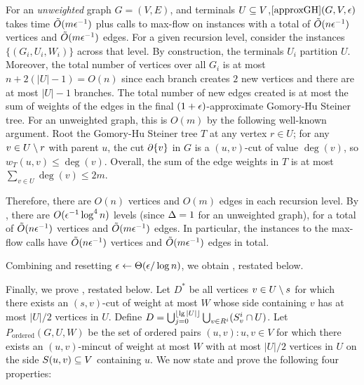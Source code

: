 \BL{}
For an \emph{unweighted} graph $G=(V,E)$, and terminals $U\subseteq V$,\linebreak $\ref{approxGH}(G,V,\epsilon)$ takes time $\tilde{O}(m\epsilon^{-1})$ plus calls to max-flow on instances with a total of $\tilde{O}(n\epsilon^{-1})$ vertices and $\tilde{O}(m\epsilon^{-1})$ edges.%
\EL
\BP
For a given recursion level, consider the instances $\{ (G_i,U_i,W_i)\}$ across that level. By construction, the terminals $U_i$ partition $U$. Moreover, the total number of vertices over all $G_i$ is at most $n+2(|U|-1)=O(n)$ since each branch creates $2$ new vertices and there are at most $|U|-1$ branches. The total number of new edges created is at most the sum of weights of the edges in the final $(1+\epsilon)$-approximate Gomory-Hu Steiner tree. For an unweighted graph, this is $O(m)$ by the following well-known argument. Root the Gomory-Hu Steiner tree $T$ at any vertex $r\in U$; for any $v\in U\setminus r$ with parent $u$, the cut $\partial\{v\}$ in $G$ is a $(u,v)$-cut of value $\deg(v)$, so $w_T(u,v)\le\deg(v)$. Overall, the sum of the edge weights in $T$ is at most $\sum_{v\in U}\deg(v)\le2m$.

Therefore, there are $O(n)$ vertices and $O(m)$ edges in each recursion level. By , there are $O(\epsilon^{-1}\log^4n)$ levels (since $\Delta=1$ for an unweighted graph), for a total of $\tilde{O}(n\epsilon^{-1})$ vertices and $\tilde{O}(m\epsilon^{-1})$ edges. In particular, the instances to the max-flow calls have $\tilde{O}(n\epsilon^{-1})$ vertices and $\tilde{O}(m\epsilon^{-1})$ edges in total.
\EP

Combining  and resetting $\epsilon\gets\Theta(\epsilon/\log n)$, we obtain , restated below.
\ApproxU*

Finally, we prove , restated below.
\LemD*
\BP
Let $D^*$ be all vertices $v\in U\setminus s$ for which there exists an $(s,v)$-cut of weight at most $W$ whose side containing $v$ has at most $|U|/2$ vertices in $U$. Define $D = \bigcup_{j=0}^{\lfloor\lg|U|\rfloor}\bigcup_{v\in R^i} (S^i_v\cap U)$.
Let $P_{\text{ordered}}(G,U,W)$ be the set of ordered pairs $(u,v):u,v\in V$ for which there exists an $(u,v)$-mincut of weight at most $W$ with at most $|U|/2$ vertices in $U$ on the side $S(u,v)\subseteq V$ containing $u$. %
We now state and prove the following four properties:

